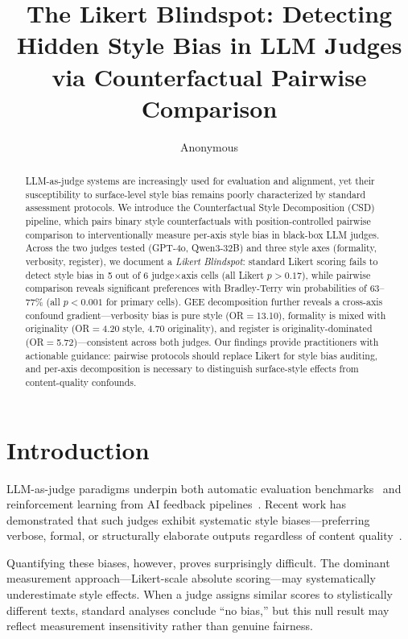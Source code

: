\documentclass[11pt,a4paper]{article}
\title{The Likert Blindspot: Detecting Hidden Style Bias in LLM Judges\\via Counterfactual Pairwise Comparison}
\author{Anonymous}
\begin{document}
\maketitle

\begin{abstract}
LLM-as-judge systems are increasingly used for evaluation and alignment, yet their susceptibility to surface-level style bias remains poorly characterized by standard assessment protocols. We introduce the Counterfactual Style Decomposition (CSD) pipeline, which pairs binary style counterfactuals with position-controlled pairwise comparison to interventionally measure per-axis style bias in black-box LLM judges. Across the two judges tested (GPT-4o, Qwen3-32B) and three style axes (formality, verbosity, register), we document a \emph{Likert Blindspot}: standard Likert scoring fails to detect style bias in 5 out of 6 judge$\times$axis cells (all Likert $p > 0.17$), while pairwise comparison reveals significant preferences with Bradley-Terry win probabilities of 63--77\% (all $p < 0.001$ for primary cells). GEE decomposition further reveals a cross-axis confound gradient---verbosity bias is pure style (OR$=$13.10), formality is mixed with originality (OR$=$4.20 style, 4.70 originality), and register is originality-dominated (OR$=$5.72)---consistent across both judges. Our findings provide practitioners with actionable guidance: pairwise protocols should replace Likert for style bias auditing, and per-axis decomposition is necessary to distinguish surface-style effects from content-quality confounds.
\end{abstract}

\section{Introduction}

LLM-as-judge paradigms underpin both automatic evaluation benchmarks~\cite{zheng2024judging,dubois2024alpacafarm} and reinforcement learning from AI feedback pipelines~\cite{bai2022constitutional}. Recent work has demonstrated that such judges exhibit systematic style biases---preferring verbose, formal, or structurally elaborate outputs regardless of content quality~\cite{wu2024style,park2024offsetbias,chen2024humans}.

Quantifying these biases, however, proves surprisingly difficult. The dominant measurement approach---Likert-scale absolute scoring---may systematically underestimate style effects. When a judge assigns similar scores to stylistically different texts, standard analyses conclude ``no bias,'' but this null result may reflect measurement insensitivity rather than genuine fairness.
\end{document}
